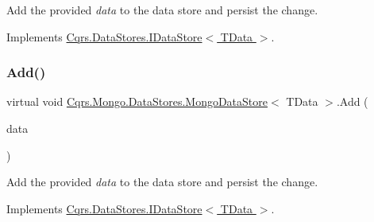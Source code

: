 Add the provided {\itshape data}  to the data store and persist the change. 



Implements \hyperlink{interfaceCqrs_1_1DataStores_1_1IDataStore_a114404daaf37fec9cc5547cd9a17858c_a114404daaf37fec9cc5547cd9a17858c}{Cqrs.\+Data\+Stores.\+I\+Data\+Store$<$ T\+Data $>$}.

\mbox{\label{classCqrs_1_1Mongo_1_1DataStores_1_1MongoDataStore_a38c242b255dc17cf8d19470fdf5a99bf_a38c242b255dc17cf8d19470fdf5a99bf}} 
\subsubsection{\texorpdfstring{Add()}{Add()}\hspace{0.1cm}{\footnotesize\ttfamily [2/2]}}
{\footnotesize\ttfamily virtual void \hyperlink{classCqrs_1_1Mongo_1_1DataStores_1_1MongoDataStore}{Cqrs.\+Mongo.\+Data\+Stores.\+Mongo\+Data\+Store}$<$ T\+Data $>$.Add (\begin{DoxyParamCaption}\item[{I\+Enumerable$<$ T\+Data $>$}]{data }\end{DoxyParamCaption})\hspace{0.3cm}{\ttfamily [virtual]}}



Add the provided {\itshape data}  to the data store and persist the change. 



Implements \hyperlink{interfaceCqrs_1_1DataStores_1_1IDataStore_a906f3f2f80db7a549a4170eca4653e26_a906f3f2f80db7a549a4170eca4653e26}{Cqrs.\+Data\+Stores.\+I\+Data\+Store$<$ T\+Data $>$}.

\mbox{\label{classCqrs_1_1Mongo_1_1DataStores_1_1MongoDataStore_af97319aef1f0484666d9ea12578b8df9_af97319aef1f0484666d9ea12578b8df9}} 
